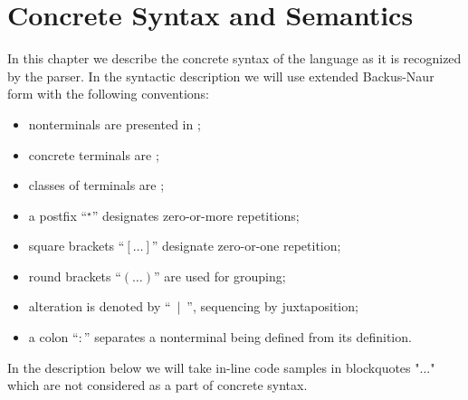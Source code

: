 \chapter{Concrete Syntax and Semantics}
\label{sec:concrete_syntax}

In this chapter we describe the concrete syntax of the language as it is recognized by the parser. In the
syntactic description we will use extended Backus-Naur form with the following conventions:

\begin{itemize}
\item nonterminals are presented in ;
\item concrete terminals are ;
\item classes of terminals are ;
\item a postfix ``$^\star$'' designates zero-or-more repetitions;
\item square brackets ``$[\dots]$'' designate zero-or-one repetition;
\item round brackets ``$(\dots)$'' are used for grouping;
\item alteration is denoted by ``$\:\:\mid\:\:$'', sequencing by juxtaposition;
\item a colon ``$:$'' separates a nonterminal being defined from its definition.
\end{itemize}

In the description below we will take in-line code samples in blockquotes "..." which are not considered as a
part of concrete syntax.








